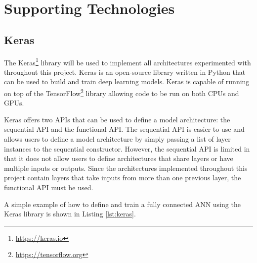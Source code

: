 


\section{Supporting Technologies}

\subsection{Keras}

The Keras\footnote{\url{https://keras.io}} library will be used to implement all architectures experimented with throughout this project. Keras is an open-source library written in Python that can be used to build and train deep learning models. Keras is capable of running on top of the TensorFlow\footnote{\url{https://tensorflow.org}} library allowing code to be run on both CPUs and GPUs.

Keras offers two APIs that can be used to define a model architecture: the sequential API and the functional API. The sequential API is easier to use and allows users to define a model architecture by simply passing a list of layer instances to the sequential constructor. However, the sequential API is limited in that it does not allow users to define architectures that share layers or have multiple inputs or outputs. Since the architectures implemented throughout this project contain layers that take inputs from more than one previous layer, the functional API must be used.

A simple example of how to define and train a fully connected ANN using the Keras library is shown in Listing \ref{lst:keras}.
